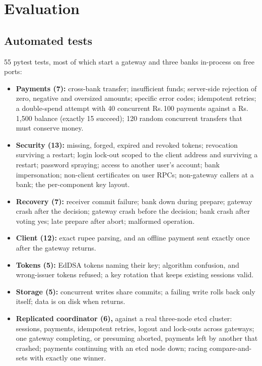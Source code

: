 \documentclass[11pt]{article}
\newcommand{\code}[1]{\texttt{\detokenize{#1}}}
\newcommand{\rupee}{Rs.\,}
\begin{document}
\section{Evaluation}

\subsection{Automated tests}
55 pytest tests, most of which start a gateway and three banks in-process on free ports:
\begin{itemize}
  \item \textbf{Payments (7):} cross-bank transfer; insufficient funds;
        server-side rejection of zero, negative and oversized amounts; specific
        error codes; idempotent retries; a double-spend attempt with 40
        concurrent \rupee100 payments against a \rupee1,500 balance (exactly 15
        succeed); 120 random concurrent transfers that must conserve money.
  \item \textbf{Security (13):} missing, forged, expired and revoked tokens;
        revocation surviving a restart; login lock-out scoped to the client
        address and surviving a restart; password spraying; access to another
        user's account; bank impersonation; non-client certificates on user
        RPCs; non-gateway callers at a bank; the per-component key layout.
  \item \textbf{Recovery (7):} receiver commit failure; bank down during
        prepare; gateway crash after the decision; gateway crash before the
        decision; bank crash after voting yes; late prepare after abort;
        malformed operation.
  \item \textbf{Client (12):} exact rupee parsing, and an offline payment sent
        exactly once after the gateway returns.
  \item \textbf{Tokens (5):} EdDSA tokens naming their key; algorithm
        confusion, \code{alg: none} and wrong-issuer tokens refused; a key
        rotation that keeps existing sessions valid.
  \item \textbf{Storage (5):} concurrent writes share commits; a failing write
        rolls back only itself; data is on disk when \code{write()} returns.
  \item \textbf{Replicated coordinator (6),} against a real three-node etcd
        cluster: sessions, payments, idempotent retries, logout and lock-outs
        across gateways; one gateway completing, or presuming aborted, payments
        left by another that crashed; payments continuing with an etcd node
        down; racing compare-and-sets with exactly one winner.
\end{itemize}
\end{document}
